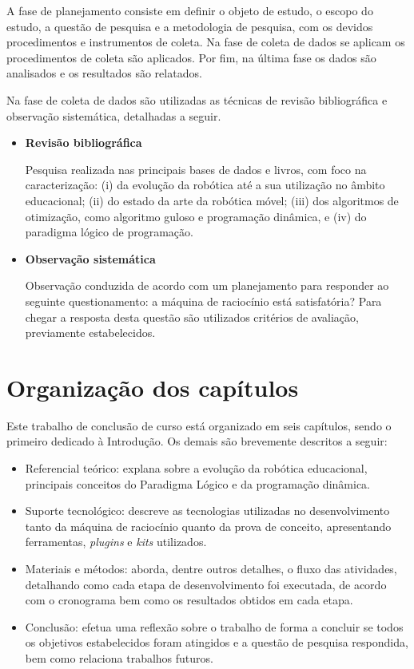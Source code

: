 A fase de planejamento consiste em definir o objeto de estudo, o escopo do estudo, a questão de pesquisa e a metodologia de pesquisa, com os devidos procedimentos e instrumentos de coleta. Na fase de coleta de dados se aplicam os procedimentos de coleta
são aplicados. Por fim, na última fase os dados são analisados e os resultados são relatados.

Na fase de coleta de dados são utilizadas as técnicas de revisão bibliográfica e observação sistemática, detalhadas a seguir.
\begin{itemize}
\item \textbf{Revisão bibliográfica} 

Pesquisa realizada nas principais bases de dados e livros, com foco na caracterização: (i) da evolução da robótica até a sua utilização no âmbito educacional; (ii) do estado da arte da robótica móvel; (iii) dos algoritmos de otimização, como algoritmo guloso e programação dinâmica, e (iv) do paradigma lógico de programação.

\item \textbf{Observação sistemática}

Observação conduzida de acordo com um planejamento para responder ao seguinte questionamento: a máquina de raciocínio está satisfatória? Para chegar a resposta desta questão são utilizados critérios de avaliação, previamente estabelecidos.

\end{itemize}
\section{Organização dos capítulos}
Este trabalho de conclusão de curso está organizado em seis capítulos, sendo o primeiro dedicado à Introdução. Os demais são brevemente descritos a seguir:
\begin{itemize}
\item Referencial teórico: explana sobre a evolução da robótica educacional, principais conceitos do Paradigma Lógico e da programação dinâmica. 
\item Suporte tecnológico: descreve as tecnologias utilizadas no desenvolvimento
tanto da máquina de raciocínio quanto da prova de conceito, apresentando ferramentas, \textit{plugins} e \textit{kits} utilizados.
\item Materiais e métodos: aborda, dentre outros detalhes, o fluxo das atividades, detalhando como cada etapa de desenvolvimento foi executada, de acordo com o cronograma bem como os resultados obtidos em cada etapa.
\item Conclusão: efetua uma reflexão sobre o trabalho de forma a concluir se todos os objetivos estabelecidos foram atingidos e a questão de pesquisa respondida, bem como relaciona trabalhos futuros.
\end{itemize}


